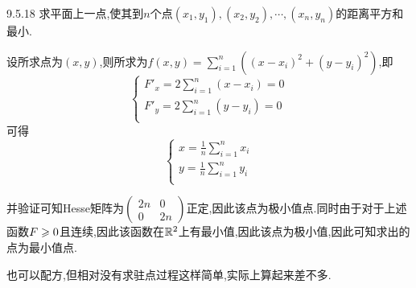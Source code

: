 \begin{exercise}{9.5.18}
    求平面上一点,使其到$n$个点$(x_1,y_1),(x_2,y_2),\cdots,(x_n,y_n)$的距离平方和最小.
\end{exercise}
\begin{solution}
    设所求点为$(x,y)$,则所求为$f(x,y)=\sum_{i=1}^{n}((x-x_i)^2+(y-y_i)^2)$,即
    $$\begin{cases}
        F'_x=2\sum_{i=1}^{n}(x-x_i)=0\\
        F'_y=2\sum_{i=1}^{n}(y-y_i)=0\\
    \end{cases}$$
    可得$$\begin{cases}
        x=\frac{1}{n}\sum_{i=1}^{n}x_i\\
        y=\frac{1}{n}\sum_{i=1}^{n}y_i\\
    \end{cases}$$

    并验证可知Hesse矩阵为$\begin{pmatrix}
        2n&0\\
        0&2n
    \end{pmatrix}$正定,因此该点为极小值点.同时由于对于上述函数$F\geqslant 0$且连续,因此该函数在$\mathbb{R}^2$上有最小值,因此该点为极小值,因此可知求出的点为最小值点.

    也可以配方,但相对没有求驻点过程这样简单,实际上算起来差不多.
\end{solution}

